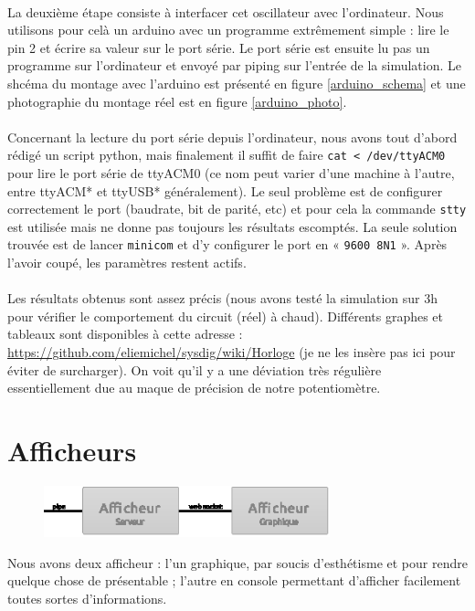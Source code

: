 \documentclass{article}
\begin{document}
\paragraph{}La deuxième étape consiste à interfacer cet oscillateur avec l'ordinateur. Nous utilisons pour celà un arduino avec un programme extrêmement simple : lire le pin 2 et écrire sa valeur sur le port série. Le port série est ensuite lu pas un programme sur l'ordinateur et envoyé par piping sur l'entrée de la simulation. Le shcéma du montage avec l'arduino est présenté en figure \ref{arduino_schema} et une photographie du montage réel est en figure \ref{arduino_photo}.

\paragraph{}Concernant la lecture du port série depuis l'ordinateur, nous avons tout d'abord rédigé un script python, mais finalement il suffit de faire \texttt{cat < /dev/ttyACM0} pour lire le port série de ttyACM0 (ce nom peut varier d'une machine à l'autre, entre ttyACM* et ttyUSB* généralement). Le seul problème est de configurer correctement le port (baudrate, bit de parité, etc) et pour cela la commande \texttt{stty} est utilisée mais ne donne pas toujours les résultats escomptés. La seule solution trouvée est de lancer \texttt{minicom} et d'y configurer le port en « \texttt{9600 8N1} ». Après l'avoir coupé, les paramètres restent actifs.


\paragraph{}Les résultats obtenus sont assez précis (nous avons testé la simulation sur 3h pour vérifier le comportement du circuit (réel) à chaud). Différents graphes et tableaux sont disponibles à cette adresse : \url{https://github.com/eliemichel/sysdig/wiki/Horloge} (je ne les insère pas ici pour éviter de surcharger). On voit qu'il y a une déviation très régulière essentiellement due au maque de précision de notre potentiomètre.


\section{Afficheurs}

\begin{figure}[h]
\centering
\includegraphics[height=4em]{zoom_output.eps}
\end{figure}
Nous avons deux afficheur : l'un graphique, par soucis d'esthétisme et pour rendre quelque chose de présentable ; l'autre en console permettant d'afficher facilement toutes sortes d'informations.
\end{document}
